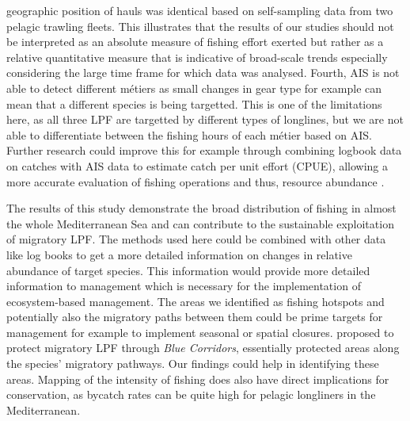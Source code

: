 geographic position of hauls was identical based on self-sampling data from two pelagic trawling
fleets. This illustrates that the results of our studies should not be interpreted as an absolute
measure of fishing effort exerted but rather as a relative quantitative measure that is indicative
of broad-scale trends especially considering the large time frame for which data was analysed.
Fourth, AIS is not able to detect different métiers as small changes in gear type for example can
mean that a different species is being targetted. This is one of the limitations here, as all three
LPF are targetted by different types of longlines, but we are not able to differentiate between the
fishing hours of each métier based on AIS\@. Further research could improve this for example
through combining logbook data on catches with AIS data to estimate catch per unit effort (CPUE),
allowing a more accurate evaluation of fishing operations and thus, resource abundance
\citep{niu_ais_cpue}.

\medskip

The results of this study demonstrate the broad distribution of fishing in almost the whole
Mediterranean Sea and can contribute to the sustainable exploitation of migratory LPF\@. The
methods used here could be combined with other data like log books to get a more detailed
information on changes in relative abundance of target species. This information would provide more
detailed information to management which is necessary for the implementation of ecosystem-based
management. The areas we identified as fishing hotspots and potentially also the migratory paths
between them could be prime targets for management for example to implement seasonal or spatial
closures. \cite{relano_pauly} proposed to protect migratory LPF through \textit{Blue Corridors},
essentially protected areas along the species' migratory pathways. Our findings could help in
identifying these areas. Mapping of the intensity of fishing does also have direct implications for
conservation, as bycatch rates can be quite high for pelagic longliners in the Mediterranean.